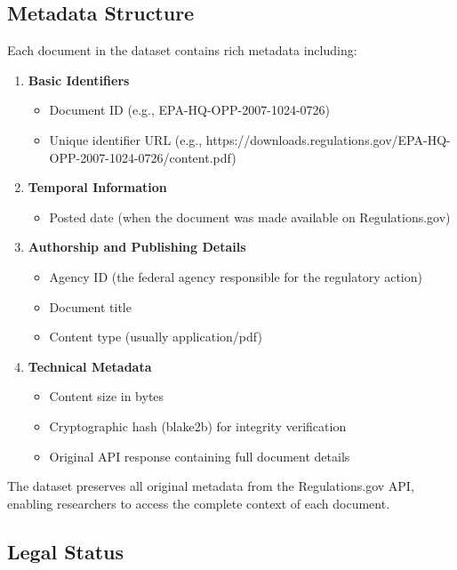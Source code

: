 \subsection{Metadata Structure}

Each document in the dataset contains rich metadata including:

\begin{enumerate}
    \item \textbf{Basic Identifiers}
    \begin{itemize}
        \item Document ID (e.g., EPA-HQ-OPP-2007-1024-0726)
        \item Unique identifier URL (e.g., https://downloads.regulations.gov/EPA-HQ-OPP-2007-1024-0726/content.pdf)
    \end{itemize}
    
    \item \textbf{Temporal Information}
    \begin{itemize}
        \item Posted date (when the document was made available on Regulations.gov)
    \end{itemize}
    
    \item \textbf{Authorship and Publishing Details}
    \begin{itemize}
        \item Agency ID (the federal agency responsible for the regulatory action)
        \item Document title
        \item Content type (usually application/pdf)
    \end{itemize}
    
    \item \textbf{Technical Metadata}
    \begin{itemize}
        \item Content size in bytes
        \item Cryptographic hash (blake2b) for integrity verification
        \item Original API response containing full document details
    \end{itemize}
\end{enumerate}

The dataset preserves all original metadata from the Regulations.gov API, enabling researchers to access the complete context of each document.

\subsection{Legal Status}

